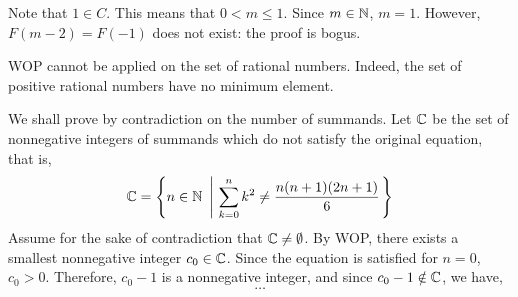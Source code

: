 \begin{pr}
    Note that $1 \in C$. This means that $0 < m \leq 1$. Since $m \in \mathbb{N}$,
    $m = 1$. However, $F(m - 2) = F(-1)$ does not exist: the proof is bogus.
\end{pr}

\begin{pr}
    WOP cannot be applied on the set of rational numbers. Indeed, the set
    of positive rational numbers have no minimum element.
\end{pr}

\begin{pr}
    We shall prove by contradiction on the number of summands. Let $\mathbb{C}$
    be the set of nonnegative integers of summands which do not satisfy
    the original equation, that is,
    \begin{equation*}
        \ms{C} = \left\{ n \in \ms{N} \ \left| \ \sum_{k=0}^{n} k^2 \neq \dfrac{n(n + 1)(2n+1)}{6} \right. \right\}
    \end{equation*}
    Assume for the sake of contradiction that $\mathbb{C} \neq \emptyset$.
    By WOP, there exists a smallest nonnegative integer $c_0 \in \mathbb{C}$.
    Since the equation is satisfied for $n = 0$, $c_0 > 0$. Therefore,
    $c_0 - 1$ is a nonnegative integer, and since $c_0 - 1 \notin \mathbb{C}$, we have,
    \begin{equation*}
        \ldots
    \end{equation*}
\end{pr}